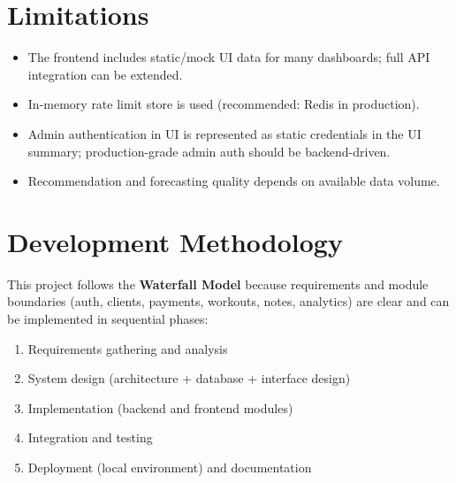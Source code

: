 \documentclass[12pt,a4paper]{report}
\begin{document}
\section{Limitations}
\begin{itemize}[leftmargin=*]
  \item The frontend includes static/mock UI data for many dashboards; full API integration can be extended.
  \item In-memory rate limit store is used (recommended: Redis in production).
  \item Admin authentication in UI is represented as static credentials in the UI summary; production-grade admin auth should be backend-driven.
  \item Recommendation and forecasting quality depends on available data volume.
\end{itemize}

\section{Development Methodology}
This project follows the \textbf{Waterfall Model} because requirements and module boundaries (auth, clients, payments, workouts, notes, analytics) are clear and can be implemented in sequential phases:
\begin{enumerate}[leftmargin=*]
  \item Requirements gathering and analysis
  \item System design (architecture + database + interface design)
  \item Implementation (backend and frontend modules)
  \item Integration and testing
  \item Deployment (local environment) and documentation
\end{enumerate}
\end{document}
